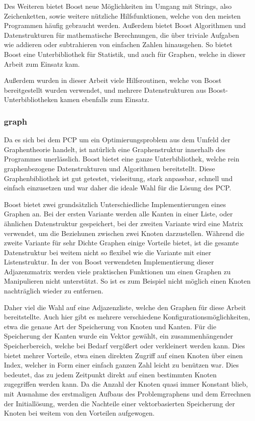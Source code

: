 Des Weiteren bietet Boost neue Möglichkeiten im Umgang mit Strings, also Zeichenketten, sowie weitere nützliche Hilfsfunktionen, welche von den meisten Programmen häufig gebraucht werden. Außerdem bietet
Boost Algorithmen und Datenstrukturen für mathematische Berechnungen, die über triviale Aufgaben wie addieren oder subtrahieren von einfachen Zahlen hinausgehen. So bietet Boost eine Unterbibliothek für 
Statistik, und auch für Graphen, welche in dieser Arbeit zum Einsatz kam.

Außerdem wurden in dieser Arbeit viele Hilfsroutinen, welche von Boost bereitgestellt wurden verwendet, und mehrere Datenstrukturen aus Boost-Unterbibliotheken kamen ebenfalls zum Einsatz.

\subsubsection{graph}
\label{sec:boost:graph}
Da es sich bei dem PCP um ein Optimierungsproblem aus dem Umfeld der Graphentheorie handelt, ist natürlich eine Graphenstruktur innerhalb des Programmes unerlässlich. Boost bietet eine ganze Unterbibliothek, 
welche rein graphenbezogene Datenstrukturen und Algorithmen bereitstellt. Diese Graphenbibliothek ist gut getestet, vielseitung, stark anpassbar, schnell und einfach einzusetzen und war daher die ideale Wahl
für die Lösung des PCP.

Boost bietet zwei grundsätzlich Unterschiedliche Implementierungen eines Graphen an. Bei der ersten Variante werden alle Kanten in einer Liste, oder ähnlichen Datenstruktur gespeichert, bei
der zweiten Variante wird eine Matrix verwendet, um die Beziehunen zwischen zwei Knoten darzustellen. Während die zweite Variante für sehr Dichte Graphen einige Vorteile bietet, ist die gesamte
Datenstruktur bei weitem nicht so flexibel wie die Variante mit einer Listenstruktur. In der von Boost verwendeten Implementierung dieser Adjazenzmatrix werden viele praktischen Funktionen um einen
Graphen zu Manipulieren nicht unterstützt. So ist es zum Beispiel nicht möglich einen Knoten nachträglich wieder zu entfernen. 

Daher viel die Wahl auf eine Adjazenzliste, welche den Graphen für diese Arbeit bereitstellte. Auch hier gibt es mehrere verschiedene Konfigurationsmöglichkeiten, etwa die genaue Art der Speicherung von
Knoten und Kanten. Für die Speicherung der Kanten wurde ein Vektor gewählt, ein zusammenhängender Speicherbereich, welche bei Bedarf vergößert oder verkleinert werden kann. Dies bietet mehrer Vorteile, etwa
einen direkten Zugriff auf einen Knoten über einen Index, welcher in Form einer einfach ganzen Zahl leicht zu benützen war. Dies bedeutet, das zu jedem Zeitpunkt direkt auf einen bestimmten Knoten zugegriffen
werden kann. Da die Anzahl der Knoten quasi immer Konstant blieb, mit Ausnahme des erstmaligen Aufbaus des Problemgraphens und dem Errechnen der Initiallösung, werden die Nachteile einer vektorbasierten
Speicherung der Knoten bei weitem von den Vorteilen aufgewogen. 

